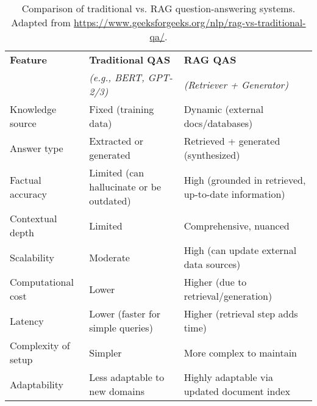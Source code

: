 \begin{spacing}{1.5}
\begin{table}[H]
\centering
\begin{tabularx}{\textwidth}{l>{\raggedright\arraybackslash}X>{\raggedright\arraybackslash}X}
\toprule
\textbf{Feature} & \textbf{Traditional QAS} & \textbf{RAG QAS} \\
& \textit{(e.g., BERT, GPT-2/3)} & \textit{(Retriever + Generator)} \\
\midrule
Knowledge source & Fixed (training data) & Dynamic (external docs/databases) \\
Answer type & Extracted or generated & Retrieved + generated (synthesized) \\
Factual accuracy & Limited (can hallucinate or be outdated) & High (grounded in retrieved, up-to-date information) \\
Contextual depth & Limited & Comprehensive, nuanced \\
Scalability & Moderate & High (can update external data sources) \\
Computational cost & Lower & Higher (due to retrieval/generation) \\
Latency & Lower (faster for simple queries) & Higher (retrieval step adds time) \\
Complexity of setup & Simpler & More complex to maintain \\
Adaptability & Less adaptable to new domains & Highly adaptable via updated document index \\
\bottomrule
\end{tabularx}
\caption{Comparison of traditional vs. RAG question-answering systems.\\ \footnotesize{Adapted from \url{https://www.geeksforgeeks.org/nlp/rag-vs-traditional-qa/}.}}
\label{tab:qa-comparison}
\end{table}

\end{spacing}
